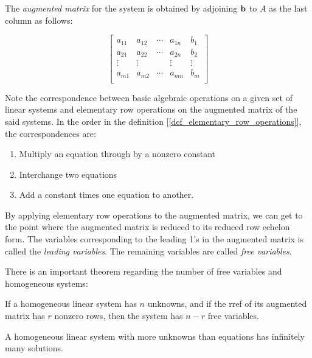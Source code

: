 \documentclass{report}
\begin{document}
		The \emph{augmented matrix} for the system is obtained by adjoining $\bf{b}$ to $A$ as the last column as follows:
		
		\begin{displaymath}
			\left[\begin{array}{cccc|c}
				a_{11} & a_{12} & \cdots & a_{1n} & b_1\\
				a_{21} & a_{22} & \cdots & a_{2n} & b_2\\
				\vdots & \vdots &        & \vdots & \vdots\\
				a_{m1} & a_{m2} & \cdots & a_{mn} & b_m\\
			\end{array}\right]
		\end{displaymath}
		
		Note the correspondence between basic algebraic operations on a given set of linear systems and elementary row operations on the augmented matrix of the said systems. In the order in the definition [\ref{def_elementary_row_operations}], the correspondences are:
		
		\begin{enumerate}
			\item Multiply an equation through by a nonzero constant
			\item Interchange two equations	
			\item Add a constant times one equation to another.
		\end{enumerate}
		
		By applying elementary row operations to the augmented matrix, we can get to the point where the augmented matrix is reduced to its reduced row echelon form. The variables corresponding to the leading 1's in the augmented matrix is called the \emph{leading variables}. The remaining variables are called \emph{free variables}.
		
		There is an important theorem regarding the number of free variables and homogeneous systems:
		
		\begin{thm}
			If a homogeneous linear system has $n$ unknowns, and if the rref of its augmented matrix has $r$ nonzero rows, then the system has $n-r$ free variables.
		\end{thm}
		
		\begin{coro}
			A homogeneous linear system with more unknowns than equations has infinitely many solutions.
		\end{coro}
		
\end{document}
